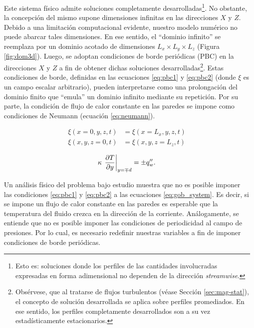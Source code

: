 Este sistema físico admite soluciones completamente desarrolladas\footnote{Esto es: soluciones donde los perfiles de las cantidades involucradas expresadas en forma adimensional no dependen de la dirección \textit{streamwise}.}. No \linebreak obstante, la concepción del mismo supone dimensiones infinitas en las direcciones $X$ y $Z$. Debido a una limitación computacional evidente, nuestro modelo numérico no puede abarcar tales dimensiones. En ese sentido, el ``dominio infinito'' se reemplaza por un dominio acotado de dimensiones $L_x \times L_y \times L_z$ (Figura \ref{fig:dom3d}). Luego, se adoptan condiciones de borde periódicas (PBC) en la direcciones $X$ y $Z$ a fin de obtener dichas soluciones desarrolladas\footnote{Obsérvese, que al tratarse de flujos turbulentos (véase Sección \ref{sec:mag-stat}), el concepto de solución \linebreak desarrollada se aplica sobre perfiles promediados. En ese sentido, los perfiles completamente desarrollados son a su vez estadísticamente estacionarios.}. Estas condiciones de borde, definidas en las ecuaciones \ref{eq:pbc1} y \ref{eq:pbc2} (donde $\xi$ es un campo escalar arbitrario), pueden interpretarse como una prolongación del dominio finito que ``emula'' un dominio infinito mediante su repetición. Por su parte, la condición de flujo de calor constante en las paredes se impone como condiciones de Neumann (ecuación \ref{eq:neumann}).

\begin{align}
\xi(x=0,y,z,t) &= \xi(x=L_x,y,z,t)
\label{eq:pbc1} \\
\xi(x,y,z=0,t) &= \xi(x,y,z=L_z,t)
\label{eq:pbc2}
\end{align}

\begin{equation}
\kappa \hspace{0.5mm} \left. \frac{\partial T}{\partial y} \right\vert_{y=\mp d} = \pm q''_w \text{.}
\label{eq:neumann}
\end{equation}



Un análisis físico del problema bajo estudio muestra que no es posible imponer las condiciones \ref{eq:pbc1} y \ref{eq:pbc2} a las ecuaciones \ref{eq:gob_system}. Es decir, si se impone un flujo de calor constante en las paredes es esperable que la temperatura del fluido crezca en la dirección de la corriente. Análogamente, se entiende que no es posible imponer las condiciones de periodicidad al campo de presiones. Por lo cual, es necesario redefinir nuestras variables a fin de imponer condiciones de borde periódicas.

